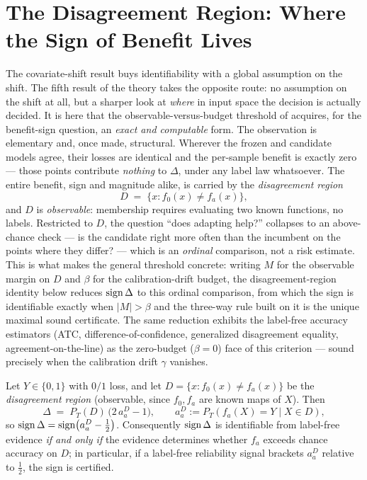 \section{The Disagreement Region: Where the Sign of Benefit Lives}
\label{sec:t2-disagree}

The covariate-shift result buys identifiability with a global assumption on the shift.
The fifth result of the theory takes the opposite route: no assumption on the shift at
all, but a sharper look at \emph{where} in input space the decision is actually
decided. It is here that the observable-versus-budget threshold of
\cite{kalai2021abstain} acquires, for the benefit-sign question, an \emph{exact and
computable} form. The observation is elementary and, once made, structural. Wherever the
frozen and candidate models agree, their losses are identical and the per-sample benefit
is exactly zero --- those points contribute \emph{nothing} to $\Delta$, under any label
law whatsoever. The entire benefit, sign and magnitude alike, is carried by the
\emph{disagreement region}
\[
D \;=\; \{x : f_0(x)\neq f_a(x)\},
\]
and $D$ is \emph{observable}: membership requires evaluating two known functions, no
labels. Restricted to $D$, the question ``does adapting help?'' collapses to an
above-chance check --- is the candidate right more often than the incumbent on the
points where they differ? --- which is an \emph{ordinal} comparison, not a risk
estimate. This is what makes the general threshold concrete: writing $M$ for the
observable margin on $D$ and $\beta$ for the calibration-drift budget, the
disagreement-region identity below reduces $\operatorname{sign}\Delta$ to this ordinal comparison,
from which the sign is identifiable exactly when $|M|>\beta$ and the three-way rule
built on it is the unique maximal sound certificate. The same reduction exhibits the
label-free accuracy estimators (ATC, difference-of-confidence, generalized disagreement
equality, agreement-on-the-line) as the zero-budget ($\beta=0$) face of this criterion
--- sound precisely when the calibration drift $\gamma$ vanishes.

\begin{theorem}
\label{thm:disagree}
Let $Y\in\{0,1\}$ with $0/1$ loss, and let $D=\{x: f_0(x)\neq f_a(x)\}$ be the
\emph{disagreement region} (observable, since $f_0,f_a$ are known maps of $X$). Then
\[
\Delta \;=\; P_T(D)\,\bigl(2\,a_a^D-1\bigr),\qquad a_a^D:=P_T\!\left(f_a(X)=Y \mid X\in D\right),
\]
so $\operatorname{sign}\Delta=\operatorname{sign}\!\left(a_a^D-\tfrac12\right)$. Consequently $\operatorname{sign}\Delta$ is
identifiable from label-free evidence \emph{if and only if} the evidence determines
whether $f_a$ exceeds chance accuracy on $D$; in particular, if a label-free
reliability signal brackets $a_a^D$ relative to $\tfrac12$, the sign is certified.
\end{theorem}

